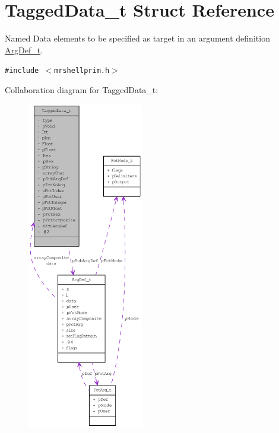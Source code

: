 \hypertarget{structTaggedData__t}{
\section{Tagged\-Data\_\-t Struct Reference}
\label{structTaggedData__t}
}
Named Data elements to be specified as target in an argument definition \hyperlink{structArgDef__t}{Arg\-Def\_\-t}.  


{\tt \#include $<$mrshellprim.h$>$}

Collaboration diagram for Tagged\-Data\_\-t:\begin{figure}[H]
\begin{center}
\leavevmode
\includegraphics[width=143pt]{structTaggedData__t__coll__graph}
\end{center}
\end{figure}
